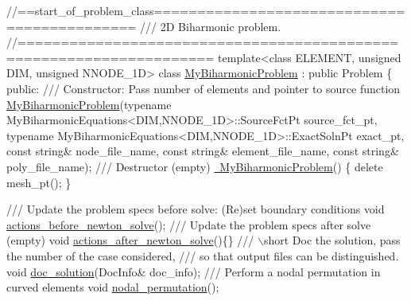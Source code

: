 \begin{DoxyCodeInclude}
\textcolor{comment}{//==start\_of\_problem\_class============================================}
\textcolor{comment}{/// 2D Biharmonic problem.}
\textcolor{comment}{}\textcolor{comment}{//====================================================================}
\textcolor{keyword}{template}<\textcolor{keyword}{class} ELEMENT, \textcolor{keywordtype}{unsigned} DIM, \textcolor{keywordtype}{unsigned} NNODE\_1D> 
\textcolor{keyword}{class }\hyperlink{classMyBiharmonicProblem}{MyBiharmonicProblem} : \textcolor{keyword}{public} Problem
\{
\textcolor{keyword}{public}:
\textcolor{comment}{}
\textcolor{comment}{ /// Constructor: Pass number of elements and pointer to source function}
\textcolor{comment}{} \hyperlink{classMyBiharmonicProblem_ab894abf54210a71c3b4e00e1b30e380e}{MyBiharmonicProblem}(\textcolor{keyword}{typename} MyBiharmonicEquations<DIM,NNODE\_1D>::SourceFctPt 
      source\_fct\_pt,
                          \textcolor{keyword}{typename} MyBiharmonicEquations<DIM,NNODE\_1D>::ExactSolnPt exact\_pt,
                          \textcolor{keyword}{const} \textcolor{keywordtype}{string}& node\_file\_name,
                          \textcolor{keyword}{const} \textcolor{keywordtype}{string}& element\_file\_name,
                          \textcolor{keyword}{const} \textcolor{keywordtype}{string}& poly\_file\_name);
\textcolor{comment}{}
\textcolor{comment}{ /// Destructor (empty)}
\textcolor{comment}{} \hyperlink{classMyBiharmonicProblem_ad6d1bdce803ec5fd13bf6b0e3b1f3ca9}{~MyBiharmonicProblem}()
  \{
   \textcolor{keyword}{delete} mesh\_pt();
  \}

 \textcolor{comment}{}
\textcolor{comment}{ /// Update the problem specs before solve: (Re)set boundary conditions}
\textcolor{comment}{} \textcolor{keywordtype}{void} \hyperlink{classMyBiharmonicProblem_ae9a9d6db2c84c3cc12138558b60d676d}{actions\_before\_newton\_solve}();
\textcolor{comment}{}
\textcolor{comment}{ /// Update the problem specs after solve (empty)}
\textcolor{comment}{} \textcolor{keywordtype}{void} \hyperlink{classMyBiharmonicProblem_a0600c4a7dff6f362b6171c66e07b594c}{actions\_after\_newton\_solve}()\{\}
\textcolor{comment}{}
\textcolor{comment}{ /// \(\backslash\)short Doc the solution, pass the number of the case considered,}
\textcolor{comment}{ /// so that output files can be distinguished.}
\textcolor{comment}{} \textcolor{keywordtype}{void} \hyperlink{classMyBiharmonicProblem_aa1c9d6b8298b2b78f5df9343349ecd70}{doc\_solution}(DocInfo& doc\_info);
 \textcolor{comment}{}
\textcolor{comment}{ /// Perform a nodal permutation in curved elements}
\textcolor{comment}{} \textcolor{keywordtype}{void} \hyperlink{classMyBiharmonicProblem_a40167119fb35b4926185b7adc23a6358}{nodal\_permutation}();


\end{DoxyCodeInclude}
